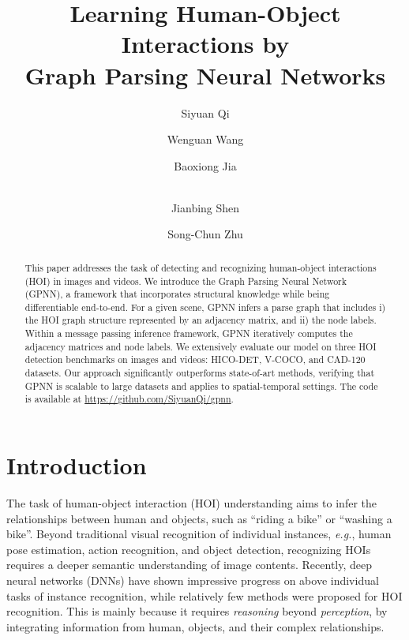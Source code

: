 \documentclass[runningheads]{llncs}
\renewcommand{\thefootnote}{\fnsymbol{footnote}}
\begin{document}
\title{Learning Human-Object Interactions by \\Graph Parsing Neural Networks}


\author{Siyuan Qi\and
Wenguan Wang\and
Baoxiong Jia\and\\
Jianbing Shen\and
Song-Chun Zhu}


\maketitle              \begin{abstract}
This paper addresses the task of detecting and recognizing human-object interactions (HOI) in images and videos. We introduce the Graph Parsing Neural Network (GPNN), a framework that incorporates structural knowledge while being differentiable end-to-end. For a given scene, GPNN infers a parse graph that includes i) the HOI graph structure represented by an adjacency matrix, and ii) the node labels. Within a message passing inference framework, GPNN iteratively computes the adjacency matrices and node labels. We extensively evaluate our model on three HOI detection benchmarks on images and videos: HICO-DET, V-COCO, and CAD-120 datasets. Our approach significantly outperforms state-of-art methods, verifying that GPNN is scalable to large datasets and applies to spatial-temporal settings. The code is available at \url{https://github.com/SiyuanQi/gpnn}.
\end{abstract}

\let\thefootnote\relax{}

\section{Introduction}
\label{sec:introduction}
The task of human-object interaction (HOI) understanding aims to infer the relationships between human and objects, such as ``riding a bike'' or ``washing a bike''. Beyond traditional visual recognition of individual instances, \textit{e.g.}, human pose estimation, action recognition, and object detection, recognizing HOIs requires a deeper semantic understanding of image contents. Recently, deep neural networks (DNNs) have shown impressive progress on above individual tasks of instance recognition, while relatively few methods  \cite{chao2015hico,chao2017learning,shenscaling,gkioxari2017detecting} were proposed for HOI recognition. This is mainly because it requires \textit{reasoning} beyond \textit{perception}, by integrating information from human, objects, and their complex relationships.
\end{document}
